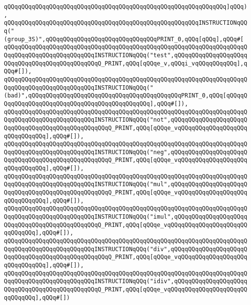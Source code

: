 \verb|qQQqqQQqqQQqqQQqqQQqqQQqqQQqqQQqqQQqqQQqqQQqqQQqqQQqqQQqqQQqqQQq]qQQq),|\newline
\verb|qQQqqQQqqQQqqQQqqQQqqQQqqQQqqQQqqQQqqQQqqQQqqQQqqQQqqQQqINSTRUCTIONqQQq("(group_3S)",qQQqqQQqqQQqqQQqqQQqqQQqqQQqqQQqPRINT_0,qQQq[qQQq],qQQq#[|\newline
\verb|qQQqqQQqqQQqqQQqqQQqqQQqqQQqqQQqqQQqqQQqqQQqqQQqqQQqqQQqqQQqqQQqqQQqqQQqqQQqqQQqqQQqqQQqqQQqqQQqINSTRUCTIONqQQq("test",qQQqqQQqqQQqqQQqqQQqqQQqqQQqqQQqqQQqqQQqqQQqqQQqQ_PRINT,qQQq[qQQqe_v,qQQqi_vqQQqqQQqqQQq],qQQq#[]),|\newline
\verb|qQQqqQQqqQQqqQQqqQQqqQQqqQQqqQQqqQQqqQQqqQQqqQQqqQQqqQQqqQQqqQQqqQQqqQQqqQQqqQQqqQQqqQQqqQQqqQQqINSTRUCTIONqQQq("(bad)",qQQqqQQqqQQqqQQqqQQqqQQqqQQqqQQqqQQqqQQqqQQqPRINT_0,qQQq[qQQqqQQqqQQqqQQqqQQqqQQqqQQqqQQqqQQqqQQqqQQqqQQq],qQQq#[]),|\newline
\verb|qQQqqQQqqQQqqQQqqQQqqQQqqQQqqQQqqQQqqQQqqQQqqQQqqQQqqQQqqQQqqQQqqQQqqQQqqQQqqQQqqQQqqQQqqQQqqQQqINSTRUCTIONqQQq("not",qQQqqQQqqQQqqQQqqQQqqQQqqQQqqQQqqQQqqQQqqQQqqQQqqQQqQ_PRINT,qQQq[qQQqe_vqQQqqQQqqQQqqQQqqQQqqQQqqQQqqQQq],qQQq#[]),|\newline
\verb|qQQqqQQqqQQqqQQqqQQqqQQqqQQqqQQqqQQqqQQqqQQqqQQqqQQqqQQqqQQqqQQqqQQqqQQqqQQqqQQqqQQqqQQqqQQqqQQqINSTRUCTIONqQQq("neg",qQQqqQQqqQQqqQQqqQQqqQQqqQQqqQQqqQQqqQQqqQQqqQQqqQQqQ_PRINT,qQQq[qQQqe_vqQQqqQQqqQQqqQQqqQQqqQQqqQQqqQQq],qQQq#[]),|\newline
\verb|qQQqqQQqqQQqqQQqqQQqqQQqqQQqqQQqqQQqqQQqqQQqqQQqqQQqqQQqqQQqqQQqqQQqqQQqqQQqqQQqqQQqqQQqqQQqqQQqINSTRUCTIONqQQq("mul",qQQqqQQqqQQqqQQqqQQqqQQqqQQqqQQqqQQqqQQqqQQqqQQqqQQqQ_PRINT,qQQq[qQQqe_vqQQqqQQqqQQqqQQqqQQqqQQqqQQqqQQq],qQQq#[]),|\newline
\verb|qQQqqQQqqQQqqQQqqQQqqQQqqQQqqQQqqQQqqQQqqQQqqQQqqQQqqQQqqQQqqQQqqQQqqQQqqQQqqQQqqQQqqQQqqQQqqQQqINSTRUCTIONqQQq("imul",qQQqqQQqqQQqqQQqqQQqqQQqqQQqqQQqqQQqqQQqqQQqqQQqQ_PRINT,qQQq[qQQqe_vqQQqqQQqqQQqqQQqqQQqqQQqqQQqqQQq],qQQq#[]),|\newline
\verb|qQQqqQQqqQQqqQQqqQQqqQQqqQQqqQQqqQQqqQQqqQQqqQQqqQQqqQQqqQQqqQQqqQQqqQQqqQQqqQQqqQQqqQQqqQQqqQQqINSTRUCTIONqQQq("div",qQQqqQQqqQQqqQQqqQQqqQQqqQQqqQQqqQQqqQQqqQQqqQQqqQQqQ_PRINT,qQQq[qQQqe_vqQQqqQQqqQQqqQQqqQQqqQQqqQQqqQQq],qQQq#[]),|\newline
\verb|qQQqqQQqqQQqqQQqqQQqqQQqqQQqqQQqqQQqqQQqqQQqqQQqqQQqqQQqqQQqqQQqqQQqqQQqqQQqqQQqqQQqqQQqqQQqqQQqINSTRUCTIONqQQq("idiv",qQQqqQQqqQQqqQQqqQQqqQQqqQQqqQQqqQQqqQQqqQQqqQQqQ_PRINT,qQQq[qQQqe_vqQQqqQQqqQQqqQQqqQQqqQQqqQQqqQQq],qQQq#[])|\newline
